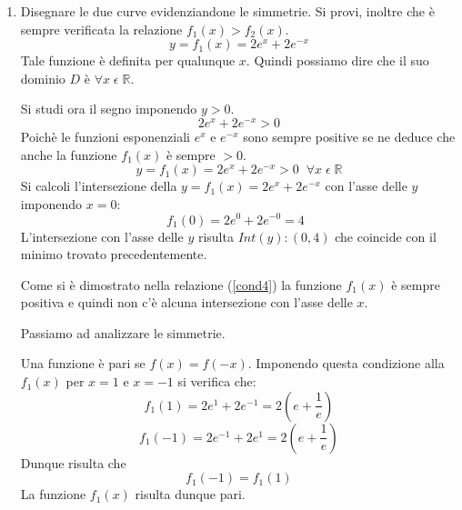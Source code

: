\documentclass[a4paper,12pt]{article}
\begin{document}
\begin{enumerate}
\item Disegnare le due curve evidenziandone le simmetrie. Si provi, inoltre che è sempre verificata la relazione $f_1(x) > f_2(x)$.
\begin{equation}y=f_1(x)=2e^x+2e^{-x}\end{equation}
Tale funzione è definita per qualunque $x$. Quindi possiamo dire che il suo dominio $D$ è $\forall x\; \epsilon\; \mathbb{R}$.

Si studi ora il segno imponendo $y>0$.
\begin{equation}\label{cond4}2e^x+2e^{-x}>0\end{equation}
Poichè le funzioni esponenziali $e^x$ e $e^{-x}$ sono sempre positive se ne deduce che anche la funzione $f_1(x)$ è sempre $>0$.
\begin{equation}y=f_1(x)=2e^x+2e^{-x}>0\;\; \forall x\; \epsilon\; \mathbb{R}\end{equation}
Si calcoli l'intersezione della $y=f_1(x)=2e^x+2e^{-x}$ con l'asse delle $y$ imponendo $x=0$:
\begin{equation}f_1(0)=2e^0+2e^{-0}=4\;\;\end{equation}
L'intersezione con l'asse delle $y$ risulta $ Int(y): (0,4)$ che coincide con il minimo trovato precedentemente.

Come si è dimostrato nella relazione (\ref{cond4}) la funzione $f_1(x)$ è sempre positiva e quindi non c'è alcuna intersezione con l'asse delle $x$.

Passiamo ad analizzare le simmetrie.

Una funzione è pari se $f(x)=f(-x)$. Imponendo questa condizione alla $f_1(x)$ per $x=1$ e $x=-1$ si verifica che:
\begin{equation}f_1(1)=2e^1+2e^{-1}=2(e+\frac{1}{e})\end{equation}
\begin{equation}f_1(-1)=2e^{-1}+2e^1=2(e+\frac{1}{e})\end{equation}
Dunque risulta che 
\begin{equation}f_1(-1)=f_1(1)\end{equation}
La funzione $f_1(x)$ risulta dunque pari.


\end{enumerate}
\end{document}
